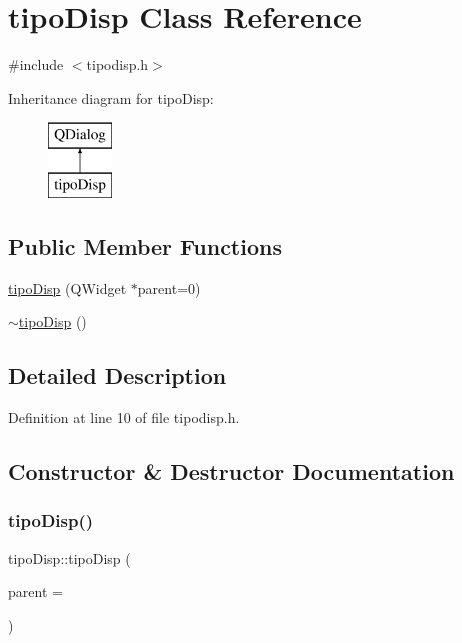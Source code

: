 \hypertarget{classtipo_disp}{}\section{tipo\+Disp Class Reference}
\label{classtipo_disp}


{\ttfamily \#include $<$tipodisp.\+h$>$}

Inheritance diagram for tipo\+Disp\+:\begin{figure}[H]
\begin{center}
\leavevmode
\includegraphics[height=2.000000cm]{classtipo_disp}
\end{center}
\end{figure}
\subsection*{Public Member Functions}
\begin{DoxyCompactItemize}
\item 
\hyperlink{classtipo_disp_a07b2e7bbbe94b97f3eab51ce63c30134}{tipo\+Disp} (Q\+Widget $\ast$parent=0)
\item 
\hyperlink{classtipo_disp_a235a754bbe34fe3a8fd5826e57cf3abe}{$\sim$tipo\+Disp} ()
\end{DoxyCompactItemize}


\subsection{Detailed Description}


Definition at line 10 of file tipodisp.\+h.



\subsection{Constructor \& Destructor Documentation}
\hypertarget{classtipo_disp_a07b2e7bbbe94b97f3eab51ce63c30134}{}\label{classtipo_disp_a07b2e7bbbe94b97f3eab51ce63c30134} 
\subsubsection{\texorpdfstring{tipo\+Disp()}{tipoDisp()}}
{\footnotesize\ttfamily tipo\+Disp\+::tipo\+Disp (\begin{DoxyParamCaption}\item[{Q\+Widget $\ast$}]{parent = {} }\end{DoxyParamCaption})\hspace{0.3cm}{\ttfamily [explicit]}}



